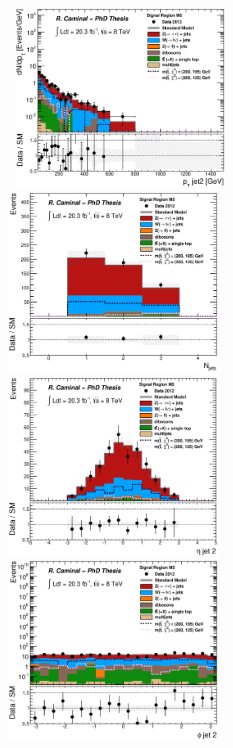 \begin{figure}[!ht]
  \begin{center}
    \mbox{
      \includegraphics[width=0.495\textwidth]{MonojetAnalysis/Figures/plot_Stop_A9_SR_pt2_fitted.eps}
      \includegraphics[width=0.495\textwidth]{MonojetAnalysis/Figures/plot_Stop_A9_SR_n_jets_fitted.eps}
    }
    \mbox{
      \includegraphics[width=0.495\textwidth]{MonojetAnalysis/Figures/plot_Stop_A9_SR_eta2_fitted.eps}
      \includegraphics[width=0.495\textwidth]{MonojetAnalysis/Figures/plot_Stop_A9_SR_phi2_fitted.eps}
}
\end{center}
\end{figure}
